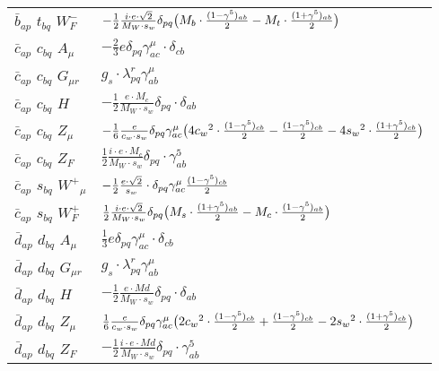 \begin{center}
\begin{tabular}{|l|l|}
$\bar{b}{}_{a p }$ \phantom{-} $t{}_{b q }$ \phantom{-} $W^-_F{}_{}$ \phantom{-}  &
	$-\frac{1}{2}\frac{ i \cdot e \cdot\sqrt{2}}{ M_W \cdot s_w}\delta_{p q} \big( M_b\cdot {(1-\gamma^5)_{a b}\over 2} - M_t\cdot {(1+\gamma^5)_{a b}\over 2} \big)$\\[2mm]
$\bar{c}{}_{a p }$ \phantom{-} $c{}_{b q }$ \phantom{-} ${A}_{\mu }$ \phantom{-}  &
	$-\frac{2}{3} e\delta_{p q} \gamma_{a c}^\mu \cdot \delta_{c b} $\\[2mm]
$\bar{c}{}_{a p }$ \phantom{-} $c{}_{b q }$ \phantom{-} ${G}_{\mu r }$ \phantom{-}  &
	$ g_s\cdot \lambda_{p q}^r \gamma_{a b}^\mu $\\[2mm]
$\bar{c}{}_{a p }$ \phantom{-} $c{}_{b q }$ \phantom{-} ${H}_{}$ \phantom{-}  &
	$-\frac{1}{2}\frac{ e \cdot M_c}{ M_W \cdot s_w}\delta_{p q} \cdot \delta_{a b} $\\[2mm]
$\bar{c}{}_{a p }$ \phantom{-} $c{}_{b q }$ \phantom{-} ${Z}_{\mu }$ \phantom{-}  &
	$-\frac{1}{6}\frac{ e}{ c_w \cdot s_w}\delta_{p q} \gamma_{a c}^\mu \big(4 c_w{}^2 \cdot {(1-\gamma^5)_{c b}\over 2} -{(1-\gamma^5)_{c b}\over 2} -4 s_w{}^2 \cdot {(1+\gamma^5)_{c b}\over 2} \big)$\\[2mm]
$\bar{c}{}_{a p }$ \phantom{-} $c{}_{b q }$ \phantom{-} $Z_F{}_{}$ \phantom{-}  &
	$\frac{1}{2}\frac{ i \cdot e \cdot M_c}{ M_W \cdot s_w}\delta_{p q} \cdot \gamma_{a b}^5 $\\[2mm]
$\bar{c}{}_{a p }$ \phantom{-} $s{}_{b q }$ \phantom{-} $W^+{}_{\mu }$ \phantom{-}  &
	$-\frac{1}{2}\frac{ e \cdot\sqrt{2}}{ s_w}\cdot \delta_{p q} \gamma_{a c}^\mu {(1-\gamma^5)_{c b}\over 2} $\\[2mm]
$\bar{c}{}_{a p }$ \phantom{-} $s{}_{b q }$ \phantom{-} $W^+_F{}_{}$ \phantom{-}  &
	$\frac{1}{2}\frac{ i \cdot e \cdot\sqrt{2}}{ M_W \cdot s_w}\delta_{p q} \big( M_s\cdot {(1+\gamma^5)_{a b}\over 2} - M_c\cdot {(1-\gamma^5)_{a b}\over 2} \big)$\\[2mm]
$\bar{d}{}_{a p }$ \phantom{-} $d{}_{b q }$ \phantom{-} ${A}_{\mu }$ \phantom{-}  &
	$\frac{1}{3} e\delta_{p q} \gamma_{a c}^\mu \cdot \delta_{c b} $\\[2mm]
$\bar{d}{}_{a p }$ \phantom{-} $d{}_{b q }$ \phantom{-} ${G}_{\mu r }$ \phantom{-}  &
	$ g_s\cdot \lambda_{p q}^r \gamma_{a b}^\mu $\\[2mm]
$\bar{d}{}_{a p }$ \phantom{-} $d{}_{b q }$ \phantom{-} ${H}_{}$ \phantom{-}  &
	$-\frac{1}{2}\frac{ e \cdot Md}{ M_W \cdot s_w}\delta_{p q} \cdot \delta_{a b} $\\[2mm]
$\bar{d}{}_{a p }$ \phantom{-} $d{}_{b q }$ \phantom{-} ${Z}_{\mu }$ \phantom{-}  &
	$\frac{1}{6}\frac{ e}{ c_w \cdot s_w}\delta_{p q} \gamma_{a c}^\mu \big(2 c_w{}^2 \cdot {(1-\gamma^5)_{c b}\over 2} +{(1-\gamma^5)_{c b}\over 2} -2 s_w{}^2 \cdot {(1+\gamma^5)_{c b}\over 2} \big)$\\[2mm]
$\bar{d}{}_{a p }$ \phantom{-} $d{}_{b q }$ \phantom{-} $Z_F{}_{}$ \phantom{-}  &
	$-\frac{1}{2}\frac{ i \cdot e \cdot Md}{ M_W \cdot s_w}\delta_{p q} \cdot \gamma_{a b}^5 $\\ \hline
\end{tabular}


\end{center}
